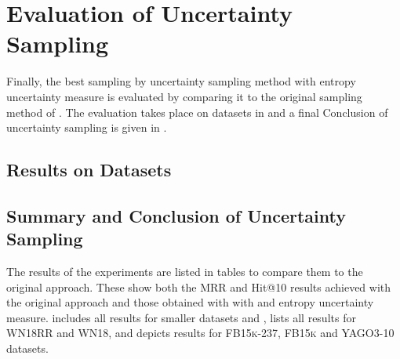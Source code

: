\section{Evaluation of Uncertainty Sampling}
\label{ch:evaluation:sec:evaluation_uncertainty}
%
Finally, the best sampling by uncertainty sampling method \ussoftmax with entropy uncertainty measure is evaluated by comparing it to the original sampling method \origsampling of \kbgan.
The evaluation takes place on datasets in  and a final Conclusion of uncertainty sampling is given in .
%
\subsection{Results on Datasets} \label{subsec:results_uncertainty}















\subsection{Summary and Conclusion of Uncertainty Sampling}
\label{subsec:uncertainty_conclusion}
%
The results of the experiments are listed in tables to compare them to the original approach.
These show both the MRR and Hit@10 results achieved with the original approach \kbgan and those obtained with \usgan with \ussoftmax and entropy uncertainty measure.
 includes all results for smaller datasets \umls and \kinship,
 lists all results for \textsc{WN18RR} and \textsc{WN18}, and  depicts results for \textsc{FB15k-237}, \textsc{FB15k} and \textsc{YAGO3-10} datasets.

